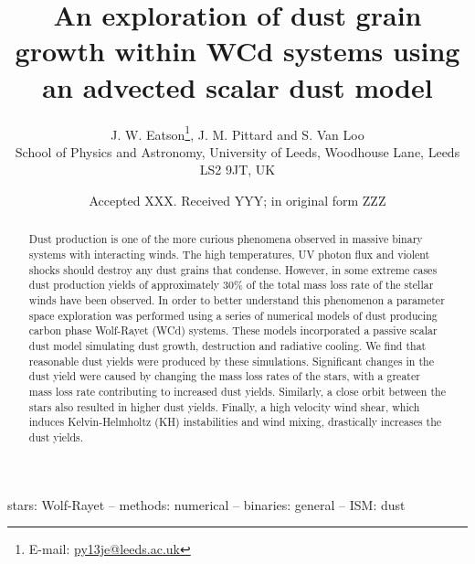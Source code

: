 \documentclass[fleqn,usenatbib]{mnras}
\title[Dust growth simulations in WCd systems]{An exploration of dust grain growth within WCd systems using an advected scalar dust model}
\author[J. W. Eatson, J. M. Pittard \& S. Van Loo]{
J. W. Eatson\thanks{E-mail: \href{mailto:py13je@leeds.ac.uk}{py13je@leeds.ac.uk}},
J. M. Pittard
and
S. Van Loo
\\
School of Physics and Astronomy, University of
       Leeds, Woodhouse Lane, Leeds LS2 9JT, UK\\  
}
\date{Accepted XXX. Received YYY; in original form ZZZ}
\begin{document}
\label{firstpage}
\pagerange{\pageref{firstpage}--\pageref{lastpage}}
\maketitle

\begin{abstract}
\noindent
Dust production is one of the more curious phenomena observed in massive binary systems with interacting winds.
The high temperatures, UV photon flux and violent shocks should destroy any dust grains that condense.
However, in some extreme cases dust production yields of approximately 30\% of the total mass loss rate of the stellar winds have been observed.
In order to better understand this phenomenon a parameter space exploration was performed using a series of numerical models of dust producing carbon phase Wolf-Rayet (WCd) systems.
These models incorporated a passive scalar dust model simulating dust growth, destruction and radiative cooling.
We find that reasonable dust yields were produced by these simulations.
Significant changes in the dust yield were caused by changing the mass loss rates of the stars, with a greater mass loss rate contributing to increased dust yields.
Similarly, a close orbit between the stars also resulted in higher dust yields.
Finally, a high velocity wind shear, which induces Kelvin-Helmholtz (KH) instabilities and wind mixing, drastically increases the dust yields.

\end{abstract}

\begin{keywords}
stars: Wolf-Rayet -- methods: numerical -- binaries: general -- ISM: dust
\end{keywords}

\end{document}
